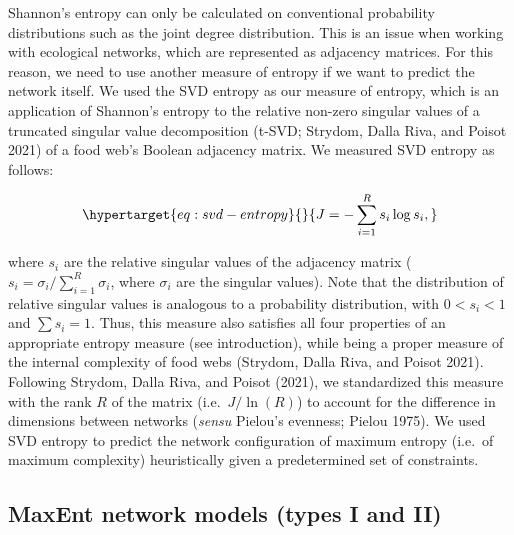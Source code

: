 \documentclass[10pt,oneside]{article}
\begin{document}
Shannon's entropy can only be calculated on conventional probability
distributions such as the joint degree distribution. This is an issue
when working with ecological networks, which are represented as
adjacency matrices. For this reason, we need to use another measure of
entropy if we want to predict the network itself. We used the SVD
entropy as our measure of entropy, which is an application of Shannon's
entropy to the relative non-zero singular values of a truncated singular
value decomposition (t-SVD; Strydom, Dalla Riva, and Poisot 2021) of a
food web's Boolean adjacency matrix. We measured SVD entropy as follows:

\begin{equation}\protect\hypertarget{eq:svd-entropy}{}{J = -\sum_{i=1}^R s_i \log s_i,}\label{eq:svd-entropy}\end{equation}

where \(s_i\) are the relative singular values of the adjacency matrix
(\(s_i = \sigma_i / \sum_{i = 1}^R \sigma_i\), where \(\sigma_i\) are
the singular values). Note that the distribution of relative singular
values is analogous to a probability distribution, with \(0 < s_i < 1\)
and \(\sum s_i = 1\). Thus, this measure also satisfies all four
properties of an appropriate entropy measure (see introduction), while
being a proper measure of the internal complexity of food webs (Strydom,
Dalla Riva, and Poisot 2021). Following Strydom, Dalla Riva, and Poisot
(2021), we standardized this measure with the rank \(R\) of the matrix
(i.e.~\(J / \ln(R)\)) to account for the difference in dimensions
between networks (\emph{sensu} Pielou's evenness; Pielou 1975). We used
SVD entropy to predict the network configuration of maximum entropy
(i.e.~of maximum complexity) heuristically given a predetermined set of
constraints.

\hypertarget{maxent-network-models-types-i-and-ii}{%
\subsection{MaxEnt network models (types I and
II)}\label{maxent-network-models-types-i-and-ii}}
\end{document}
